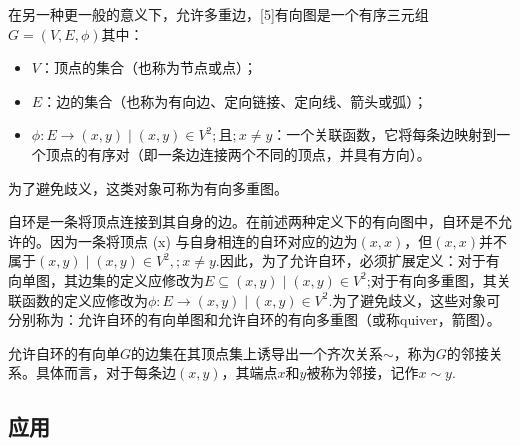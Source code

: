 在另一种更一般的意义下，允许多重边，[5]有向图是一个有序三元组$G = (V, E, \phi)$其中：
\begin{itemize}
\item $V$：顶点的集合（也称为节点或点）；
\item $E$：边的集合（也称为有向边、定向链接、定向线、箭头或弧）；
\item $\phi : E \to {(x,y) \mid (x,y) \in V^{2} ;\text{且}; x \neq y}$：一个关联函数，它将每条边映射到一个顶点的有序对（即一条边连接两个不同的顶点，并具有方向）。
\end{itemize}
为了避免歧义，这类对象可称为有向多重图。

自环是一条将顶点连接到其自身的边。在前述两种定义下的有向图中，自环是不允许的。因为一条将顶点 (x) 与自身相连的自环对应的边为$(x,x)$，但$(x,x)$并不属于${(x,y)\mid (x,y)\in V^{2}, ; x \neq y}$.因此，为了允许自环，必须扩展定义：对于有向单图，其边集的定义应修改为$E \subseteq {(x,y)\mid (x,y)\in V^{2}}$;对于有向多重图，其关联函数的定义应修改为$\phi : E \to {(x,y)\mid (x,y)\in V^{2}}$.为了避免歧义，这些对象可分别称为：允许自环的有向单图和允许自环的有向多重图（或称quiver，箭图）。

允许自环的有向单$G$的边集在其顶点集上诱导出一个齐次关系$\sim$，称为$G$的邻接关系。具体而言，对于每条边$(x,y)$，其端点$x$和$y$被称为邻接，记作$x \sim y$.
\subsection{应用}

